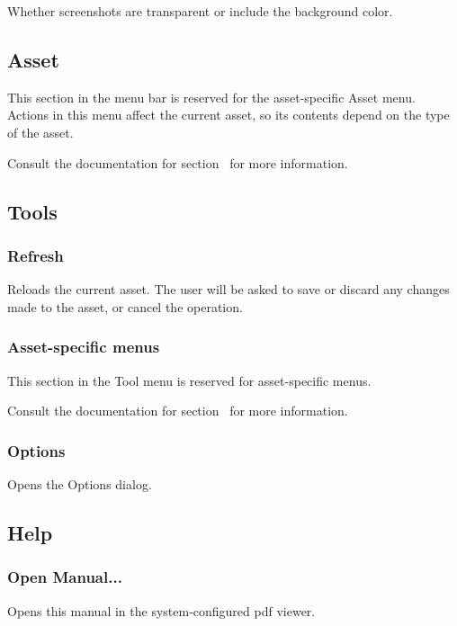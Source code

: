 \documentclass[10pt, a4paper, titlepage, oneside]{article}
\begin{document}
Whether screenshots are transparent or include the background color.

\newpage

\subsection{Asset}

This section in the menu bar is reserved for the asset-specific Asset menu. Actions in this menu affect the current asset, so its contents depend on the type of the asset.

Consult the documentation for section~ for more information.

\subsection{Tools}

\subsubsection{Refresh}

Reloads the current asset. The user will be asked to save or discard any changes made to the asset, or cancel the operation.

\subsubsection{Asset-specific menus}

This section in the Tool menu is reserved for asset-specific menus.

Consult the documentation for section~ for more information.

\subsubsection{Options}

Opens the Options dialog.

\subsection{Help}

\subsubsection{Open Manual...}

Opens this manual in the system-configured pdf viewer.
\end{document}
